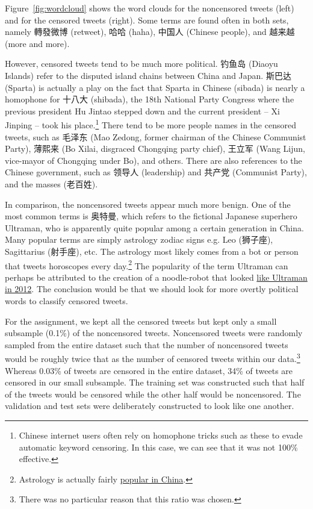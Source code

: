 \documentclass{sig-alternate-05-2015}
\begin{document}
Figure~\ref{fig:wordcloud} shows the word clouds for the noncensored tweets (left) and for the censored tweets (right). Some terms are found often in both sets, namely 轉發微博 (retweet), 哈哈 (haha), 中国人 (Chinese people), and 越来越 (more and more). 

However, censored tweets tend to be much more political. 钓鱼岛 (Diaoyu Islands) refer to the disputed island chains between China and Japan. 斯巴达 (Sparta) is actually a play on the fact that Sparta in Chinese (sibada) is nearly a homophone for 十八大 (shibada), the 18th National Party Congress where the previous president Hu Jintao stepped down and the current president -- Xi Jinping -- took his place.\footnote{Chinese internet users often rely on homophone tricks such as these to evade automatic keyword censoring. In this case, we can see that it was not 100\% effective.} There tend to be more people names in the censored tweets, such as 毛泽东 (Mao Zedong, former chairman of the Chinese Communist Party), 薄熙来 (Bo Xilai, disgraced Chongqing party chief), 王立军 (Wang Lijun, vice-mayor of Chongqing under Bo), and others. There are also references to the Chinese government, such as 领导人 (leadership) and 共产党 (Communist Party), and the masses (老百姓).

In comparison, the noncensored tweets appear much more benign. One of the most common terms is 奥特曼, which refers to the fictional Japanese superhero Ultraman, who is apparently quite popular among a certain generation in China. Many popular terms are simply astrology zodiac signs e.g. Leo (狮子座), Sagittarius (射手座), etc. The astrology most likely comes from a bot or person that tweets horoscopes every day.\footnote{Astrology is actually fairly \href{https://newrepublic.com/article/119500/chinese-astrology-surprising-prominence-horoscopes}{popular in China}.} The popularity of the term Ultraman can perhaps be attributed to the creation of a noodle-robot that looked \href{http://asiasociety.org/blog/asia/video-when-going-gets-tough-superhero-robot-turns-noodle-making}{like Ultraman in 2012}. The conclusion would be that we should look for more overtly political words to classify censored tweets.

For the assignment, we kept all the censored tweets but kept only a small subsample (0.1\%) of the noncensored tweets. Noncensored tweets were randomly sampled from the entire dataset such that the number of noncensored tweets would be roughly twice that as the number of censored tweets within our data.\footnote{There was no particular reason that this ratio was chosen.} Whereas 0.03\% of tweets are censored in the entire dataset, 34\% of tweets are censored in our small subsample. The training set was constructed such that half of the tweets would be censored while the other half would be noncensored. The validation and test sets were deliberately constructed to look like one another. 
\end{document}
